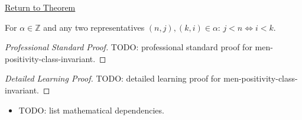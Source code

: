 \newpage
{}
\label{prf:men-positivity-class-invariant}

\begin{remark*}[Return]
\hyperref[lem:men-positivity-class-invariant]{Return to Theorem}
\end{remark*}

\begin{theorem*}
For $\alpha\in\mathbb{Z}$ and any two representatives
$(n,j),(k,i)\in\alpha$: $j<n \iff i<k$.
\end{theorem*}

\begin{proof}[Professional Standard Proof]
\LRAProofBodyStart
TODO: professional standard proof for men-positivity-class-invariant.
\end{proof}

\begin{proof}[Detailed Learning Proof]
\LRAProofBodyStart
TODO: detailed learning proof for men-positivity-class-invariant.
\end{proof}

\begin{remark*}
\end{remark*}

\begin{dependencies}
\begin{itemize}
  \item TODO: list mathematical dependencies.
\end{itemize}
\end{dependencies}

\clearpage
